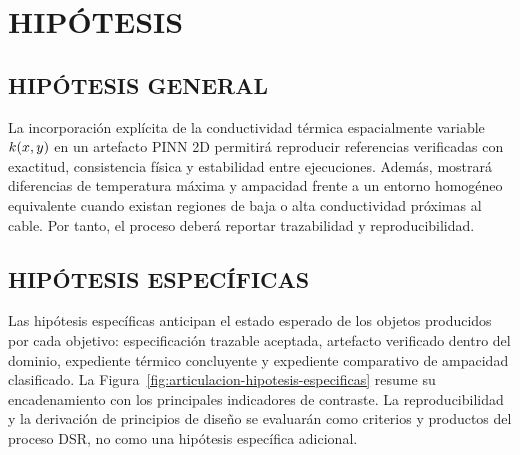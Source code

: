 \section{HIPÓTESIS}

\subsection{HIPÓTESIS GENERAL}

La incorporación explícita de la conductividad térmica espacialmente variable $k(x,y)$ en un artefacto PINN 2D permitirá reproducir referencias verificadas con exactitud, consistencia física y estabilidad entre ejecuciones. Además, mostrará diferencias de temperatura máxima y ampacidad frente a un entorno homogéneo equivalente cuando existan regiones de baja o alta conductividad próximas al cable. Por tanto, el proceso deberá reportar trazabilidad y reproducibilidad.

\subsection{HIPÓTESIS ESPECÍFICAS}

Las hipótesis específicas anticipan el estado esperado de los objetos producidos por cada objetivo: especificación trazable aceptada, artefacto verificado dentro del dominio, expediente térmico concluyente y expediente comparativo de ampacidad clasificado. La Figura~\ref{fig:articulacion-hipotesis-especificas} resume su encadenamiento con los principales indicadores de contraste. La reproducibilidad y la derivación de principios de diseño se evaluarán como criterios y productos del proceso DSR, no como una hipótesis específica adicional.

